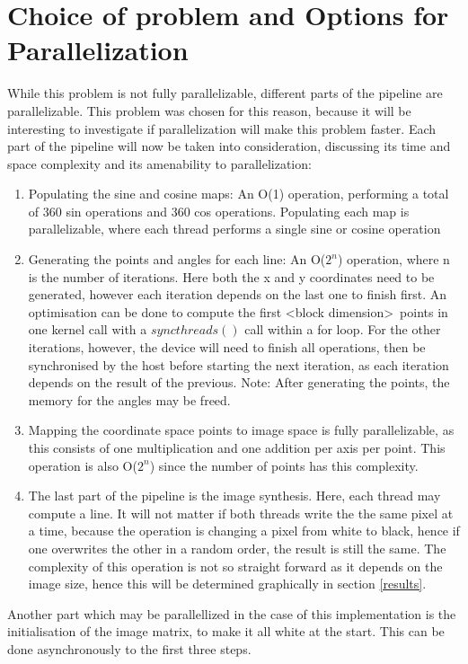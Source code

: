 \section{Choice of problem and Options for Parallelization}
While this problem is not fully parallelizable, different parts of the pipeline are parallelizable. This problem was chosen for this reason, because it will be interesting to investigate if parallelization will make this problem faster. Each part of the pipeline will now be taken into consideration, discussing its time and space complexity and its amenability to parallelization:

\begin{enumerate}
	\item Populating the sine and cosine maps: An O(1) operation, performing a total of 360 sin operations and 360 cos operations. Populating each map is parallelizable, where each thread performs a single sine or cosine operation
	\item Generating the points and angles for each line: An O($2^n$) operation, where n is the number of iterations. Here both the x and y coordinates need to be generated, however each iteration depends on the last one to finish first. An optimisation can be done to compute the first \textless block dimension\textgreater\ points in one kernel call with a $syncthreads()$ call within a for loop. For the other iterations, however, the device will need to finish all operations, then be synchronised by the host before starting the next iteration, as each iteration depends on the result of the previous. Note: After generating the points, the memory for the angles may be freed.
	\item Mapping the coordinate space points to image space is fully parallelizable, as this consists of one multiplication and one addition per axis per point. This operation is also O($2^n$) since the number of points has this complexity.
	\item The last part of the pipeline is the image synthesis. Here, each thread may compute a line. It will not matter if both threads write the the same pixel at a time, because the operation is changing a pixel from white to black, hence if one overwrites the other in a random order, the result is still the same. The complexity of this operation is not so straight forward as it depends on the image size, hence this will be determined graphically in section \ref{results}.
\end{enumerate}

Another part which may be parallellized in the case of this implementation is the initialisation of the image matrix, to make it all white at the start. This can be done asynchronously to the first three steps.

